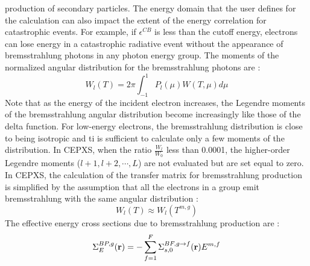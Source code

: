production of secondary particles. The energy domain that the user defines for
the calculation can also impact the extent of the energy correlation for
catastrophic events. For example, if $\epsilon^{CB}$ is less than the cutoff
energy, electrons can lose energy in a catastrophic radiative event without
the appearance of bremsstrahlung photons in any photon energy group. The
moments of the normalized angular distribution for the bremsstrahlung photons
are :
\begin{equation}
W_l(T) = 2\pi \int_{-1}^1 P_l(\mu) W(T,\mu) d\mu
\end{equation}
Note that as the energy of the incident electron increases, the Legendre
moments of the bremsstrahlung angular distribution become increasingly like
those of the delta function. For low-energy electrons, the bremsstrahlung
distribution is close to being isotropic and ti is sufficient to calculate
only a few moments of the distribution. In CEPXS, when the ratio
$\frac{W_l}{W_0}$ less than 0.0001, the higher-order Legendre moments
($l+1,l+2,\cdots,L$) are not evaluated but are set equal to zero.\\
In CEPXS, the calculation of the transfer matrix for bremsstrahlung production
is simplified by the assumption that all the electrons in a group emit
bremsstrahlung with the same angular distribution :
\begin{equation}
W_l(T) \approx W_l(T^{m,g})
\end{equation}
The effective energy cross sections due to bremsstrahlung production are :
\begin{equation}
\Sigma_{E}^{BP,g}(\mathbf{r}) = - \sum_{f=1}^F \Sigma_{s,0}^{BF,g\rightarrow f}(\mathbf{r})
E^{m,f}
\end{equation}

